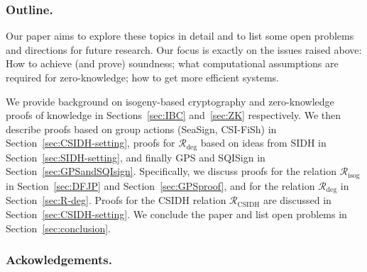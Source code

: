 \documentclass{llncs}
\newcommand{\R}[1][]{\ensuremath{\mathcal{R}_{\mathrm{#1}}}}
\newcommand{\comment}[1]{{\color{gray}#1}}
\newcommand{\CP}[1]{\comment{Christophe: #1}}
\begin{document}












\subsubsection{Outline.}

Our paper aims to explore these topics in detail and to list some open problems and directions for future research.
Our focus is exactly on the issues raised above: How to achieve (and prove) soundness; what computational assumptions are required for zero-knowledge; how to get more efficient systems.

We provide background on isogeny-based cryptography and zero-knowledge proofs of knowledge in Sections~\ref{sec:IBC} and~\ref{sec:ZK} respectively. 
%
We then describe proofs based on group actions (SeaSign, CSI-FiSh) in Section~\ref{sec:CSIDH-setting}, proofs for $\R[deg]$ based on ideas from SIDH in Section~\ref{sec:SIDH-setting}, and finally GPS and SQISign in Section~\ref{sec:GPSandSQIsign}.
%
Specifically, we discuss proofs for the relation $ \R[isog] $ in Section~\ref{sec:DFJP} and Section~\ref{sec:GPSproof}, and for the relation $\R[deg]$ in Section~\ref{sec:R-deg}.
Proofs for the CSIDH relation $\R[CSIDH]$ are discussed in Section~\ref{sec:CSIDH-setting}.
%
We conclude the paper and list open problems in Section~\ref{sec:conclusion}.


\subsubsection{Ackowledgements.}
\end{document}

